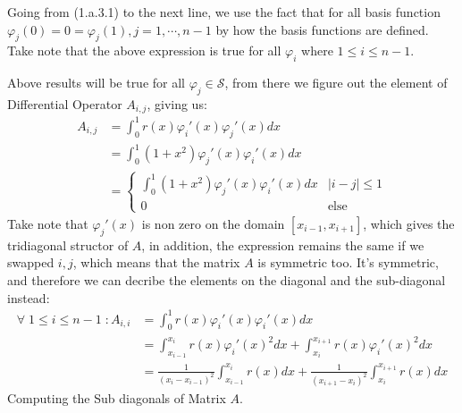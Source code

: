 \documentclass[]{article}
\begin{document}
        Going from (1.a.3.1) to the next line, we use the fact that for all basis function $\varphi_j(0) = 0 = \varphi_j(1), j=1,\cdots, n - 1$ by how the basis functions are defined. Take note that the above expression is true for all $\varphi_i$ where $1\le i \le n - 1$. 
        \par
        Above results will be true for all $\varphi_j\in \mathcal{S}$, from there we figure out the element of Differential Operator $A_{i, j}$, giving us: 
        \begin{align*}\tag{1.a.4}\label{eqn:1.a.4}
            A_{i, j}& = \int_{0}^{1} 
                r(x)\varphi_i'(x)\varphi_j'(x)
            dx
            \\
            &= 
            \int_{0}^{1} 
                (1 + x^2)\varphi_j'(x)\varphi_i'(x)
            dx
            \\
            &= \begin{cases}
                \int_{0}^{1} 
                    (1 + x^2)\varphi_j'(x)\varphi_i'(x)
                dx & |i - j| \le 1
                \\
                0 & \text{else }
            \end{cases}
        \end{align*}
        Take note that $\varphi_j'(x)$ is non zero on the domain $[x_{i - 1}, x_{i + 1}]$, which gives the tridiagonal structor of $A$, in addition, the expression remains the same if we swapped $i, j$, which means that the matrix $A$ is symmetric too. It's symmetric, and therefore we can decribe the elements on the diagonal and the sub-diagonal instead: 
        \begin{align*}\tag{1.a.5}\label{eqn:1.a.5}
            \forall\; 1 \le i \le n - 1 \; :
            A_{i, i} &= 
            \int_{0}^{1} 
                r(x)\varphi_i'(x)\varphi_i'(x)
            dx
            \\
            &= 
            \int_{x_{i - 1}}^{x_i} 
                r(x)\varphi_i'(x)^2
            dx +
            \int_{x_{i}}^{x_{i + 1}} 
                r(x)\varphi_i'(x)^2
            dx
            \\
            &= 
            \frac{1}{(x_{i} - x_{i - 1})^2}
            \int_{x_{i - 1}}^{x_i} r(x)dx
            + 
            \frac{1}{(x_{i + 1} - x_i)^2}\int_{x_{i}}^{x_{i + 1}} 
                r(x)
            dx
        \end{align*}
        Computing the Sub diagonals of Matrix $A$. 
\end{document}
